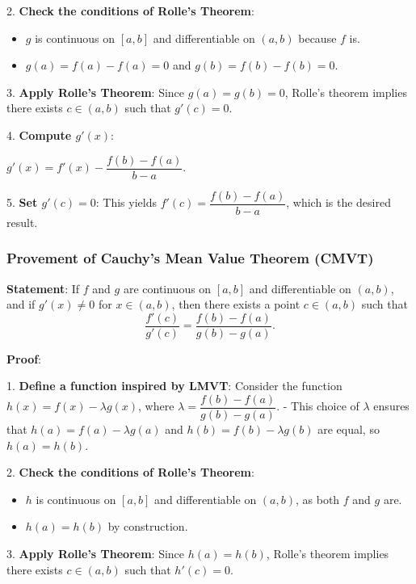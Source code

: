 \documentclass[a4paper,12pt]{book}
\begin{document}
2. \textbf{Check the conditions of Rolle’s Theorem}:

\begin{itemize}
	\item 
	\( g \) is continuous on \([a, b]\) and differentiable on \((a, b)\) because \( f \) is.
	\item 
	\( g(a) = f(a) - f(a) = 0 \) and \( g(b) = f(b) - f(b) = 0 \).
\end{itemize}

3. \textbf{Apply Rolle's Theorem}: Since \( g(a) = g(b) = 0 \), Rolle’s theorem implies there exists \( c \in (a, b) \) such that \( g'(c) = 0 \).

4. \textbf{Compute \( g'(x) \)}:

\( g'(x) = f'(x) - \dfrac{f(b) - f(a)}{b - a} \).

5. \textbf{Set \( g'(c) = 0 \)}: This yields \( f'(c) = \dfrac{f(b) - f(a)}{b - a} \), which is the desired result.

\subsubsection{Provement of Cauchy’s Mean Value Theorem (CMVT)}

\textbf{Statement}: If \( f \) and \( g \) are continuous on \([a, b]\) and differentiable on \((a, b)\), and if \( g'(x) \neq 0 \) for \( x \in (a, b) \), then there exists a point \( c \in (a, b) \) such that
\[
\dfrac{f'(c)}{g'(c)} = \dfrac{f(b) - f(a)}{g(b) - g(a)}.
\]

\textbf{Proof}:

1. \textbf{Define a function inspired by LMVT}: Consider the function \( h(x) = f(x) - \lambda g(x) \), where \( \lambda = \dfrac{f(b) - f(a)}{g(b) - g(a)} \).
- This choice of \( \lambda \) ensures that \( h(a) = f(a) - \lambda g(a) \) and \( h(b) = f(b) - \lambda g(b) \) are equal, so \( h(a) = h(b) \).

2. \textbf{Check the conditions of Rolle’s Theorem}:

\begin{itemize}
	\item 
	\( h \) is continuous on \([a, b]\) and differentiable on \((a, b)\), as both \( f \) and \( g \) are.
	\item 
	\( h(a) = h(b) \) by construction.
\end{itemize}

3. \textbf{Apply Rolle’s Theorem}: Since \( h(a) = h(b) \), Rolle’s theorem implies there exists \( c \in (a, b) \) such that \( h'(c) = 0 \).
\end{document}
